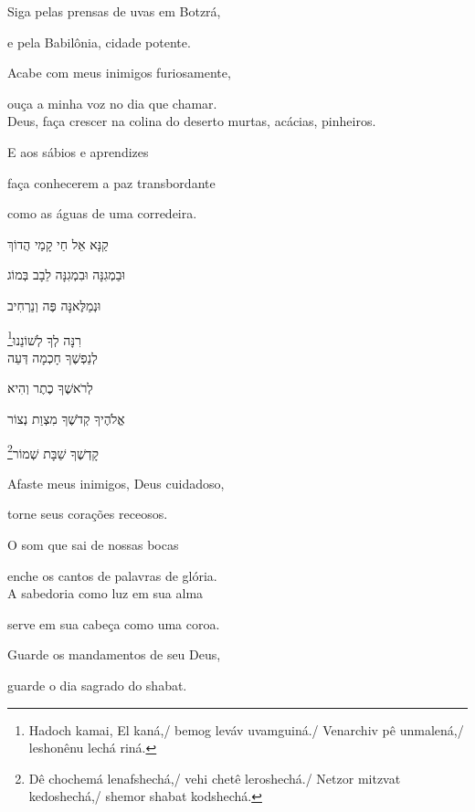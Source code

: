 Siga pelas prensas de uvas em Botzrá,

e pela Babilônia, cidade potente.

Acabe com meus inimigos furiosamente,

ouça a minha voz no dia que chamar.\\[10pt]


Deus, faça crescer na colina do deserto murtas, acácias, pinheiros.

E aos sábios e aprendizes

faça conhecerem a paz transbordante

como as águas de uma corredeira.\\[10pt]


\movetoevenpage
\raggedleft %

\vspace*{1cm}

קַנָּא אֵל חַי קָמַי הֲדוֹךְ

וּבַמְגִנָּה וּבִמְגִנָּה לֵבָב בְּמוֹג

וּנְמַלֶּאנָּה פֶּה וְנַרְחִיב

\footnote{Hadoch kamai, El kaná,/ bemog leváv uvamguiná./ Venarchiv pê unmalená,/ leshonênu lechá riná.}רִנָּה לְךָ לְשׁוֹנֵנוּ\\[10pt]

לְנַפְשֶׁךָ חָכְמָה דְּעֵה

לְרֹאשֶׁךָ כֶתֶר וְהִיא

אֱלֹהֶיךָ קְדֹשֶׁךָ מִצְוַת נְצוֹר

\footnote{Dê chochemá lenafshechá,/ vehi chetê leroshechá./ Netzor mitzvat kedoshechá,/ shemor shabat kodshechá.}קָדְשֶׁךָ שַׁבָּת שְׁמוֹר 

\movetooddpage
\raggedright %

\vspace*{1cm}

Afaste meus inimigos, Deus cuidadoso,

torne seus corações receosos.

O som que sai de nossas bocas

enche os cantos de palavras de glória.\\[10pt]

A sabedoria como luz em sua alma

serve em sua cabeça como uma coroa.

Guarde os mandamentos de seu Deus,

guarde o dia sagrado do shabat.\\[10pt]




